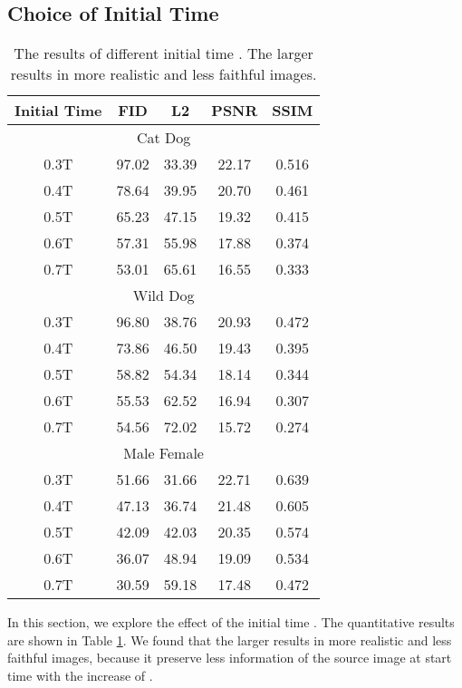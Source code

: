 \documentclass{article}
\begin{document}
\subsection{Choice of Initial Time }
\label{sec:initial time}
\begin{table}
\caption{The results of different initial time . The larger  results in more realistic and less faithful images.}
\vspace{.2cm}
\label{tb:initial time}
\centering
\renewcommand\arraystretch{1.2}
\begin{tabular}{ccccc} 
\toprule
Initial Time         & FID                   & L2                    & PSNR                  & SSIM                    \\
\midrule
\multicolumn{5}{c}{Cat  Dog}                                                                          \\ 
\midrule
0.3T & 97.02 & 33.39 & 22.17 & 0.516 \\
0.4T & 78.64 & 39.95 & 20.70 & 0.461 \\
0.5T & 65.23 & 47.15 & 19.32 & 0.415 \\
0.6T & 57.31 & 55.98 & 17.88 & 0.374 \\
0.7T & 53.01 & 65.61 & 16.55 & 0.333 \\
\midrule
\multicolumn{5}{c}{Wild  Dog}                                                                         \\
\midrule
0.3T & 96.80 & 38.76 & 20.93 & 0.472 \\
0.4T & 73.86 & 46.50 & 19.43 & 0.395 \\
0.5T & 58.82 & 54.34 & 18.14 & 0.344 \\
0.6T & 55.53 & 62.52 & 16.94 & 0.307 \\
0.7T & 54.56 & 72.02 & 15.72 & 0.274 \\
\midrule
\multicolumn{5}{c}{Male  Female}                                                         \\
\midrule
0.3T & 51.66 & 31.66 & 22.71 & 0.639 \\
0.4T & 47.13 & 36.74 & 21.48 & 0.605 \\
0.5T & 42.09 & 42.03 & 20.35 & 0.574 \\
0.6T & 36.07 & 48.94 & 19.09 & 0.534 \\
0.7T & 30.59 & 59.18 & 17.48 & 0.472      \\
\bottomrule
\end{tabular}
\end{table}
In this section, we explore the effect of the initial time . The quantitative results are shown in Table \ref{tb:initial time}. We found that the larger  results in more realistic and less faithful images, because it preserve less information of the source image at start time with the increase of .
\end{document}
